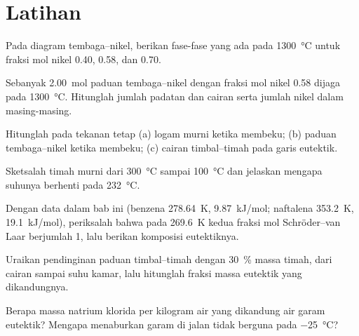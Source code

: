 \section{Latihan}

\begin{exercise}[$\star$]\label{exo:b2:solid-liquid-diagrams:1}
Pada diagram tembaga--nikel, berikan fase-fase yang ada pada
\qty{1300}{\degreeCelsius} untuk fraksi mol nikel 0.40, 0.58, dan 0.70.
\end{exercise}

\begin{exercise}[$\star$]\label{exo:b2:solid-liquid-diagrams:2}
Sebanyak \qty{2.00}{mol} paduan tembaga--nikel dengan fraksi mol nikel 0.58
dijaga pada \qty{1300}{\degreeCelsius}. Hitunglah jumlah padatan dan
cairan serta jumlah nikel dalam masing-masing.
\end{exercise}

\begin{exercise}[$\star$]\label{exo:b2:solid-liquid-diagrams:3}
Hitunglah  pada tekanan tetap (a) logam murni ketika membeku;
(b) paduan tembaga--nikel ketika membeku; (c) cairan timbal--timah pada
garis eutektik.
\end{exercise}

\begin{exercise}[$\star$]\label{exo:b2:solid-liquid-diagrams:4}
Sketsalah  timah murni dari \qty{300}{\degreeCelsius}
sampai \qty{100}{\degreeCelsius} dan jelaskan mengapa suhunya berhenti
pada \qty{232}{\degreeCelsius}.
\end{exercise}

\begin{exercise}[$\star\star$]\label{exo:b2:solid-liquid-diagrams:5}
Dengan data dalam bab ini (benzena \qty{278.64}{K}, \qty{9.87}{kJ/mol};
naftalena \qty{353.2}{K}, \qty{19.1}{kJ/mol}), periksalah bahwa pada
\qty{269.6}{K} kedua fraksi mol Schröder--van Laar berjumlah 1, lalu
berikan komposisi eutektiknya.
\end{exercise}

\begin{exercise}[$\star\star$]\label{exo:b2:solid-liquid-diagrams:6}
Uraikan pendinginan paduan timbal--timah dengan 30~\% massa timah, dari
cairan sampai suhu kamar, lalu hitunglah fraksi massa eutektik yang
dikandungnya.
\end{exercise}

\begin{exercise}[$\star\star$]\label{exo:b2:solid-liquid-diagrams:7}
Berapa massa natrium klorida per kilogram air yang dikandung air garam
eutektik? Mengapa menaburkan garam di jalan tidak berguna pada
\qty{-25}{\degreeCelsius}?
\end{exercise}

